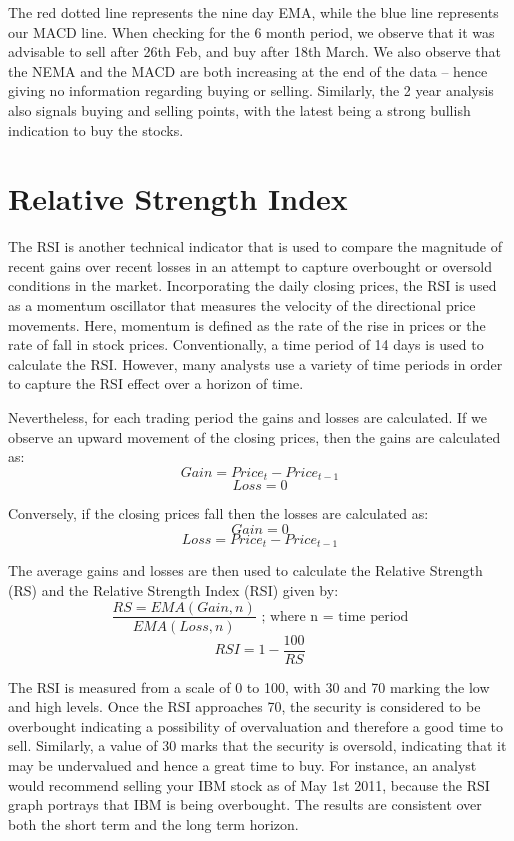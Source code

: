 \documentclass[12pt]{article}
\begin{document}
The red dotted line represents the nine day EMA, while the blue line represents our MACD line. When checking for the 6 month period, we observe that it was advisable to sell after 26th Feb, and buy after 18th March. We also observe that the NEMA and the MACD are both increasing at the end of the data – hence giving no information regarding buying or selling. Similarly, the 2 year analysis also signals buying and selling points, with the latest being a strong bullish indication to buy the stocks.

\section{Relative Strength Index}
\hspace{6 mm}The RSI is another technical indicator that is used to compare the magnitude of recent gains over recent losses in an attempt to capture overbought or oversold conditions in the market. Incorporating the daily closing prices, the RSI is used as a momentum oscillator that measures the velocity of the directional price movements. Here, momentum is defined as the rate of the rise in prices or the rate of fall in stock prices. Conventionally, a time period of 14 days is used to calculate the RSI. However, many analysts use a variety of time periods in order to capture the RSI effect over a horizon of time.

Nevertheless, for each trading period the gains and losses are calculated. If we observe an upward movement of the closing prices, then the gains are calculated as:
\[
		Gain=Price_{t}-Price_{t-1}
\]
\[
		Loss=0
\] 

Conversely, if the closing prices fall then the losses are calculated as:
\[
		Gain=0
\]
\[
		Loss=Price_{t}-Price_{t-1}
\]

The average gains and losses are then used to calculate the Relative Strength (RS) and the Relative Strength Index (RSI) given by:
\[
		\frac{RS=EMA(Gain, n)}{EMA(Loss, n)} \text{ ; where n = time period}
\]
\[
		RSI=1- \frac{100}{RS}
\]

The RSI is measured from a scale of 0 to 100, with 30 and 70 marking the low and high levels. Once the RSI approaches 70, the security is considered to be overbought indicating a possibility of overvaluation and therefore a good time to sell. Similarly, a value of 30 marks that the security is oversold, indicating that it may be undervalued and hence a great time to buy. For instance, an analyst would recommend selling your IBM stock as of May 1st 2011, because the RSI graph portrays that IBM is being overbought. The results are consistent over both the short term and the long term horizon.  
\end{document}
